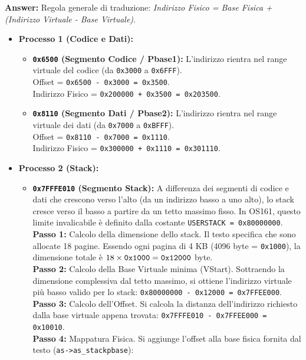 \textbf{Answer:}
Regola generale di traduzione: \textit{Indirizzo Fisico = Base Fisica + (Indirizzo Virtuale - Base Virtuale)}.

\begin{itemize}
    \item \textbf{Processo 1 (Codice e Dati):}
    \begin{itemize}
        \item \textbf{\texttt{0x6500} (Segmento Codice / Pbase1):} L'indirizzo rientra nel range virtuale del codice (da \texttt{0x3000} a \texttt{0x6FFF}).\\
        Offset = \texttt{0x6500 - 0x3000 = 0x3500}.\\
        Indirizzo Fisico = \texttt{0x200000 + 0x3500 = 0x203500}.
        \item \textbf{\texttt{0x8110} (Segmento Dati / Pbase2):} L'indirizzo rientra nel range virtuale dei dati (da \texttt{0x7000} a \texttt{0xBFFF}).\\
        Offset = \texttt{0x8110 - 0x7000 = 0x1110}.\\
        Indirizzo Fisico = \texttt{0x300000 + 0x1110 = 0x301110}.
    \end{itemize}
    \item \textbf{Processo 2 (Stack):}
    \begin{itemize}
        \item \textbf{\texttt{0x7FFFE010} (Segmento Stack):} A differenza dei segmenti di codice e dati che crescono verso l'alto (da un indirizzo basso a uno alto), lo stack cresce verso il basso a partire da un tetto massimo fisso. In OS161, questo limite invalicabile è definito dalla costante \texttt{USERSTACK = 0x80000000}.\\
        \textbf{Passo 1:} Calcolo della dimensione dello stack. Il testo specifica che sono allocate 18 pagine. Essendo ogni pagina di 4 KB (4096 byte = \texttt{0x1000}), la dimensione totale è $18 \times \text{\texttt{0x1000}} = \text{\texttt{0x12000}}$ byte.\\
        \textbf{Passo 2:} Calcolo della Base Virtuale minima (VStart). Sottraendo la dimensione complessiva dal tetto massimo, si ottiene l'indirizzo virtuale più basso valido per lo stack:
        \texttt{0x80000000 - 0x12000 = 0x7FFEE000}.\\
        \textbf{Passo 3:} Calcolo dell'Offset. Si calcola la distanza dell'indirizzo richiesto dalla base virtuale appena trovata:
        \texttt{0x7FFFE010 - 0x7FFEE000 = 0x10010}.\\
        \textbf{Passo 4:} Mappatura Fisica. Si aggiunge l'offset alla base fisica fornita dal testo (\texttt{as->as\_stackpbase}):

\end{itemize}
\end{itemize}

